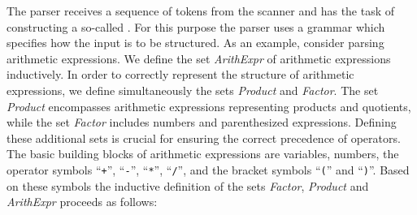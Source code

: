 The parser receives a sequence of tokens from the scanner and has the task of constructing a so-called
.  For this purpose the parser uses a
grammar which specifies how the input is to be structured.  As an example, consider parsing arithmetic
expressions.  We define the set \textsl{ArithExpr} of arithmetic expressions inductively.  
In order to correctly represent the structure of arithmetic expressions, we define
simultaneously the sets \textsl{Product} and \textsl{Factor}.
The set \textsl{Product} encompasses arithmetic expressions representing products and quotients, while the set
\textsl{Factor} includes numbers and parenthesized expressions. Defining these additional sets is crucial for
ensuring the correct precedence of operators.  The basic building blocks of arithmetic expressions are
variables, numbers, the operator symbols 
``\texttt{+}'', ``\texttt{-}'', ``\texttt{*}'', ``\texttt{/}'',
and the bracket symbols ``\texttt{(}'' and ``\texttt{)}''.  Based on these symbols
the inductive definition of the sets \textsl{Factor}, \textsl{Product} and
\textsl{ArithExpr} proceeds as follows:
